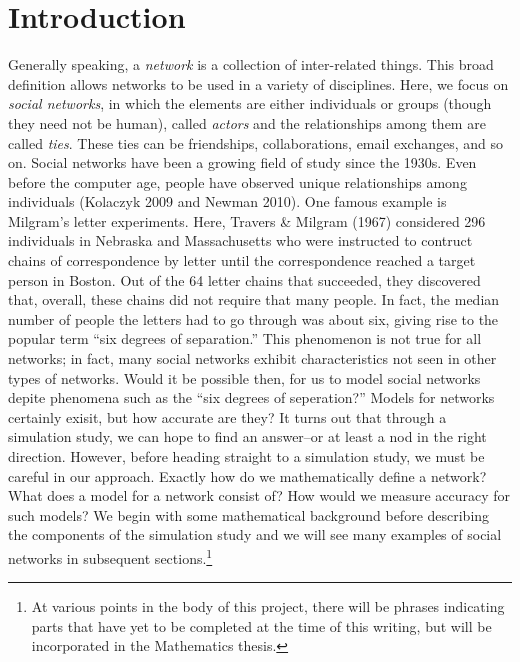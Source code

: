 \documentclass[12pt,twoside]{amherstthesis}
\begin{document}
  
  \mainmatter %
  \pagestyle{fancyplain} %

  \chapter*{Introduction}\label{introduction}
  
  Generally speaking, a \emph{network} is a collection of inter-related
  things. This broad definition allows networks to be used in a variety of
  disciplines. Here, we focus on \emph{social networks}, in which the
  elements are either individuals or groups (though they need not be
  human), called \emph{actors} and the relationships among them are called
  \emph{ties}. These ties can be friendships, collaborations, email
  exchanges, and so on. Social networks have been a growing field of study
  since the 1930s. Even before the computer age, people have observed
  unique relationships among individuals (Kolaczyk 2009 and Newman 2010).
  One famous example is Milgram's letter experiments. Here, Travers \&
  Milgram (1967) considered 296 individuals in Nebraska and Massachusetts
  who were instructed to contruct chains of correspondence by letter until
  the correspondence reached a target person in Boston. Out of the 64
  letter chains that succeeded, they discovered that, overall, these
  chains did not require that many people. In fact, the median number of
  people the letters had to go through was about six, giving rise to the
  popular term ``six degrees of separation.'' This phenomenon is not true
  for all networks; in fact, many social networks exhibit characteristics
  not seen in other types of networks. Would it be possible then, for us
  to model social networks depite phenomena such as the ``six degrees of
  seperation?'' Models for networks certainly exisit, but how accurate are
  they? It turns out that through a simulation study, we can hope to find
  an answer--or at least a nod in the right direction. However, before
  heading straight to a simulation study, we must be careful in our
  approach. Exactly how do we mathematically define a network? What does a
  model for a network consist of? How would we measure accuracy for such
  models? We begin with some mathematical background before describing the
  components of the simulation study and we will see many examples of
  social networks in subsequent sections.\footnote{At various points in
    the body of this project, there will be phrases indicating parts that
    have yet to be completed at the time of this writing, but will be
    incorporated in the Mathematics thesis.}
  
\end{document}
